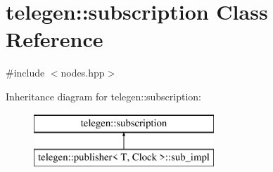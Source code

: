 \hypertarget{classtelegen_1_1subscription}{}\section{telegen\+:\+:subscription Class Reference}
\label{classtelegen_1_1subscription}


{\ttfamily \#include $<$nodes.\+hpp$>$}

Inheritance diagram for telegen\+:\+:subscription\+:\begin{figure}[H]
\begin{center}
\leavevmode
\includegraphics[height=2.000000cm]{classtelegen_1_1subscription}
\end{center}
\end{figure}
